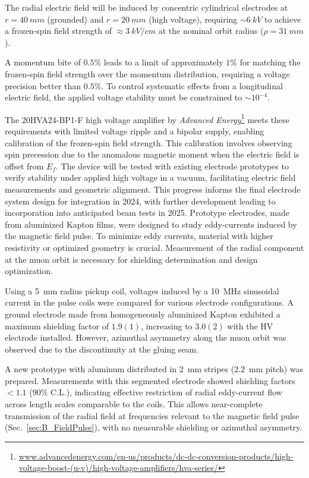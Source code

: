 \begin{refsection}
The radial electric field will be induced by concentric cylindrical electrodes at $r=\SI{40}{mm}$ (grounded) and $r=\SI{20}{mm}$ (high voltage), requiring $\sim\SI{6}{kV}$ to achieve a frozen-spin field strength of $\approx\SI{3}{kV\per cm}$ at the nominal orbit radius ($\rho=\SI{31}{mm}$).

A momentum bite of $0.5\%$ leads to a limit of approximately $1\%$ for matching the frozen-spin field strength over the momentum distribution, requiring a voltage precision better than $0.5\%$. To control systematic effects from a longitudinal electric field, the applied voltage stability must be constrained to $\sim10^{-4}$.

The 20HVA24-BP1-F high voltage amplifier by \textit{Advanced Energy}\footnote{\url{www.advancedenergy.com/en-us/products/dc-dc-conversion-products/high-voltage-boost-(u-v)/high-voltage-amplifiers/hva-series/}} meets these requirements with limited voltage ripple and a bipolar supply, enabling calibration of the frozen-spin field strength. This calibration involves observing spin precession due to the anomalous magnetic moment when the electric field is offset from $E_f$. The device will be tested with existing electrode prototypes to verify stability under applied high voltage in a vacuum, facilitating electric field measurements and geometric alignment. This progress informs the final electrode system design for integration in 2024, with further development leading to incorporation into anticipated beam tests in 2025.
Prototype electrodes, made from aluminized Kapton films, were designed to study eddy-currents induced by the magnetic field pulse. To minimize eddy currents, material with higher resistivity or optimized geometry is crucial. Measurement of the radial component at the muon orbit is necessary for shielding determination and design optimization.

Using a \SI{5}{mm} radius pickup coil, voltages induced by a \SI{10}{\mega\hertz} sinusoidal current in the pulse coils were compared for various electrode configurations. A ground electrode made from homogeneously aluminized Kapton exhibited a maximum shielding factor of $1.9(1)$, increasing to $3.0(2)$ with the HV electrode installed. However, azimuthal asymmetry along the muon orbit was observed due to the discontinuity at the gluing seam.

A new prototype with aluminum distributed in \SI{2}{mm} stripes (\SI{2.2}{mm} pitch) was prepared. Measurements with this segmented electrode showed shielding factors $<1.1$ ($90\%$ C.L.), indicating effective restriction of radial eddy-current flow across length scales comparable to the coils. This allows near-complete transmission of the radial field at frequencies relevant to the magnetic field pulse (Sec.~\ref{sec:B_FieldPulse}), with no measurable shielding or azimuthal asymmetry.


\end{refsection}
